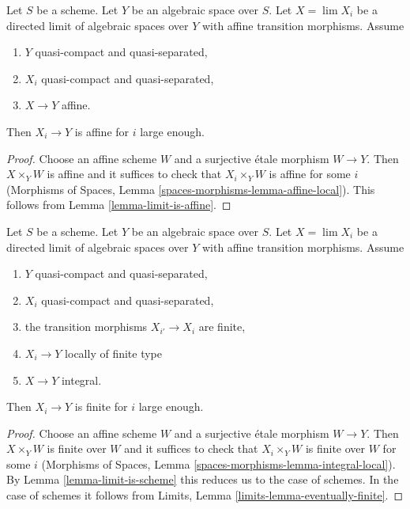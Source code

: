 \begin{lemma}
\label{lemma-eventually-affine}
Let $S$ be a scheme. Let $Y$ be an algebraic space over $S$.
Let $X = \lim X_i$ be a directed limit of algebraic spaces over $Y$
with affine transition morphisms. Assume
\begin{enumerate}
\item $Y$ quasi-compact and quasi-separated,
\item $X_i$ quasi-compact and quasi-separated,
\item $X \to Y$ affine.
\end{enumerate}
Then $X_i \to Y$ is affine for $i$ large enough.
\end{lemma}

\begin{proof}
Choose an affine scheme $W$ and a surjective \'etale morphism $W \to Y$.
Then $X \times_Y W$ is affine and it suffices to check that
$X_i \times_Y W$ is affine for some $i$ (Morphisms of Spaces,
Lemma \ref{spaces-morphisms-lemma-affine-local}).
This follows from Lemma \ref{lemma-limit-is-affine}.
\end{proof}

\begin{lemma}
\label{lemma-eventually-finite}
Let $S$ be a scheme. Let $Y$ be an algebraic space over $S$.
Let $X = \lim X_i$ be a directed limit of algebraic spaces
over $Y$ with affine transition morphisms. Assume
\begin{enumerate}
\item $Y$ quasi-compact and quasi-separated,
\item $X_i$ quasi-compact and quasi-separated,
\item the transition morphisms $X_{i'} \to X_i$ are finite,
\item $X_i \to Y$ locally of finite type
\item $X \to Y$ integral.
\end{enumerate}
Then $X_i \to Y$ is finite for $i$ large enough.
\end{lemma}

\begin{proof}
Choose an affine scheme $W$ and a surjective \'etale morphism $W \to Y$.
Then $X \times_Y W$ is finite over $W$ and it suffices to check that
$X_i \times_Y W$ is finite over $W$ for some $i$ (Morphisms of Spaces,
Lemma \ref{spaces-morphisms-lemma-integral-local}). By
Lemma \ref{lemma-limit-is-scheme} this reduces us to the case of schemes.
In the case of schemes it follows from
Limits, Lemma \ref{limits-lemma-eventually-finite}.
\end{proof}

